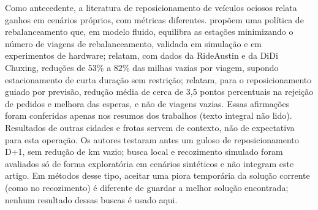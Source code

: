 Como antecedente, a literatura de reposicionamento de veículos ociosos relata ganhos em cenários próprios, com métricas diferentes.  propõem uma política de rebalanceamento que, em modelo fluido, equilibra as estações minimizando o número de viagens de rebalanceamento, validada em simulação e em experimentos de hardware;  relatam, com dados da RideAustin e da DiDi Chuxing, reduções de 53\% a 82\% das milhas vazias por viagem, supondo estacionamento de curta duração sem restrição;  relatam, para o reposicionamento guiado por previsão, redução média de cerca de 3,5 pontos percentuais na rejeição de pedidos e melhora das esperas, e não de viagens vazias. Essas afirmações foram conferidas apenas nos resumos dos trabalhos (texto integral não lido). Resultados de outras cidades e frotas servem de contexto, não de expectativa para esta operação. Os autores testaram antes um guloso de reposicionamento D+1, sem redução de km vazio; busca local e recozimento simulado \cite{kirkpatrick1983} foram avaliados só de forma exploratória em cenários sintéticos e não integram este artigo. Em métodos desse tipo, aceitar uma piora temporária da solução corrente (como no recozimento) é diferente de guardar a melhor solução encontrada; nenhum resultado dessas buscas é usado aqui.
